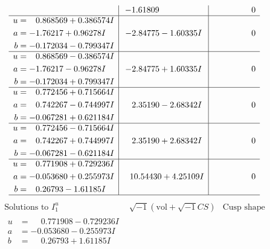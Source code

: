 \documentclass[1p]{elsarticle_modified}
\theoremstyle{definition}
\newcommand{\I}{\sqrt{-1}}
\begin{document}
$$\begin{array}{c|c|c}
 & -1.61809\phantom{ +0.000000I} & \phantom{-0.000000 } 0 \\ \hline\begin{aligned}
u &= \phantom{-}0.868569 + 0.386574 I \\
a &= -1.76217 + 0.96278 I \\
b &= -0.172034 - 0.799347 I\end{aligned}
 & -2.84775 - 1.60335 I & \phantom{-0.000000 } 0 \\ \hline\begin{aligned}
u &= \phantom{-}0.868569 - 0.386574 I \\
a &= -1.76217 - 0.96278 I \\
b &= -0.172034 + 0.799347 I\end{aligned}
 & -2.84775 + 1.60335 I & \phantom{-0.000000 } 0 \\ \hline\begin{aligned}
u &= \phantom{-}0.772456 + 0.715664 I \\
a &= \phantom{-}0.742267 - 0.744997 I \\
b &= -0.067281 + 0.621184 I\end{aligned}
 & \phantom{-}2.35190 - 2.68342 I & \phantom{-0.000000 } 0 \\ \hline\begin{aligned}
u &= \phantom{-}0.772456 - 0.715664 I \\
a &= \phantom{-}0.742267 + 0.744997 I \\
b &= -0.067281 - 0.621184 I\end{aligned}
 & \phantom{-}2.35190 + 2.68342 I & \phantom{-0.000000 } 0 \\ \hline\begin{aligned}
u &= \phantom{-}0.771908 + 0.729236 I \\
a &= -0.053680 + 0.255973 I \\
b &= \phantom{-}0.26793 - 1.61185 I\end{aligned}
 & \phantom{-}10.54430 + 4.25109 I & \phantom{-0.000000 } 0\\
 \hline 
 \end{array}$$\newpage$$\begin{array}{c|c|c}  
\text{Solutions to }I^u_{1}& \I (\text{vol} + \sqrt{-1}CS) & \text{Cusp shape}\\
 \hline 
\begin{aligned}
u &= \phantom{-}0.771908 - 0.729236 I \\
a &= -0.053680 - 0.255973 I \\
b &= \phantom{-}0.26793 + 1.61185 I\end{aligned}

\end{array}$$
\end{document}
